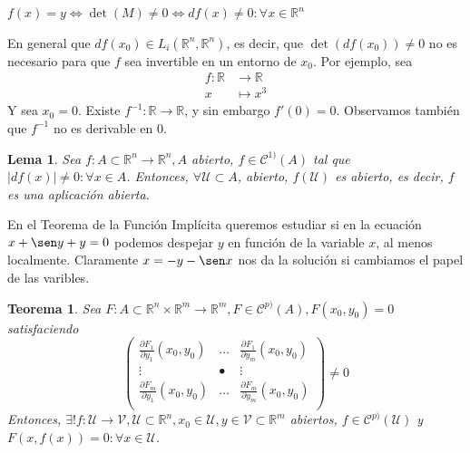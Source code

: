 \documentclass[10pt,a4paper,openright]{book}
\theoremstyle{break}
\newtheorem*{theo}{Teorema}
\newtheorem*{lema}{Lema}
\begin{document}
$f(x) = y \Leftrightarrow \det(M) \neq 0 \Leftrightarrow df(x) \neq 0 : \forall x \in \mathbb{R}^n$

En general que $df(x_0) \in L_i(\mathbb{R}^n, \mathbb{R}^n)$, es decir, que $\det(df(x_0)) \neq 0$ no es necesario para que $f$ sea invertible en un entorno de $x_0$. Por ejemplo, sea \begin{align*}
f : \mathbb{R} &\to \mathbb{R} \\ x &\mapsto x^3
\end{align*}
Y sea $x_0 = 0$. Existe $f^{-1} : \mathbb{R} \to \mathbb{R}$, y sin embargo $f'(0) = 0$. Observamos también que $f^{-1}$ no es derivable en $0$.

\begin{lema}
Sea $f: A \subset \mathbb{R}^n \to \mathbb{R}^n, A$ abierto, $f \in \mathcal{C}^{1)}(A)$ tal que $|df(x)| \neq 0: \forall x \in A$. Entonces, $\forall \mathcal{U} \subset A$, abierto, $f(\mathcal{U})$ es abierto, es decir, $f$ es una aplicación abierta.
\end{lema}

En el Teorema de la Función Implícita queremos estudiar si en la ecuación $x  + \sen y + y = 0$ podemos despejar $y$ en función de la variable $x$, al menos localmente. Claramente $x = -y - \sen x$ nos da la solución si cambiamos el papel de las varibles.

\begin{theo}
Sea $F: A \subset \mathbb{R}^n \times \mathbb{R}^m \to \mathbb{R}^m, F \in \mathcal{C}^{p)}(A), F(x_0, y_0) = 0$ satisfaciendo 
$$\begin{pmatrix} \frac{\partial F_1}{\partial y_1} (x_0, y_0) & \ldots & \frac{\partial F_1}{\partial y_m} (x_0, y_0) \\ \vdots & • & \vdots \\ \frac{\partial F_m}{\partial y_1} (x_0, y_0) & \ldots & \frac{\partial F_m}{\partial y_m} (x_0, y_0) \\

\end{pmatrix} \neq 0$$
Entonces, $\exists ! f: \mathcal{U} \to \mathcal{V}, \mathcal{U} \subset \mathbb{R}^n, x_0 \in \mathcal{U}, y \in \mathcal{V} \subset \mathbb{R}^m$ abiertos, $f \in \mathcal{C}^{p)} (\mathcal{U})$ y $F(x, f(x)) = 0 : \forall x \in \mathcal{U}$.
\end{theo}
\end{document}
